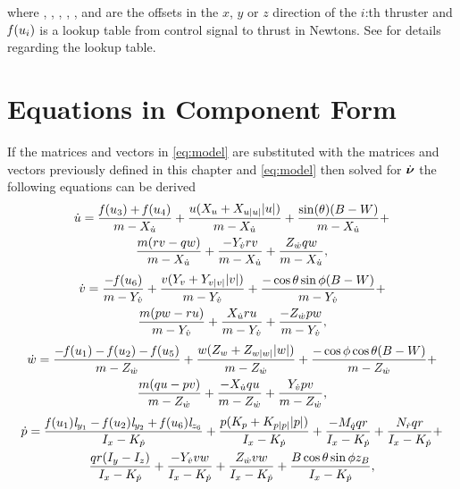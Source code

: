 where , , , , ,  and  are the offsets in the $x$, $y$ or $z$ direction of the $i$:th thruster and $\mathit{f}(u_{i})$ is a lookup table from control signal to thrust in Newtons. See  for details regarding the lookup table.

\section{Equations in Component Form}
If the matrices and vectors in \eqref{eq:model} are substituted with the matrices and vectors previously defined in this chapter and \eqref{eq:model} then solved for $\dot{\boldsymbol{\nu}}$ the following equations can be derived 
\begin{multline} \label{eq:u_dot}
\dot{u} = \frac{\mathit{f}(u_{3}) + \mathit{f}(u_{4})}{m -X_{\dot{u}}} + \frac{u (X_{u} + X_{u|u|} |u|)}{m -X_{\dot{u}}} + \frac{\sin(\theta)(B - W)}{m -X_{\dot{u}}} +\\
\frac{m(r v - q w )}{m -X_{\dot{u}}} + \frac{-Y_{\dot{v}} r v}{m -X_{\dot{u}}} + \frac{Z_{\dot{w}} q w}{m -X_{\dot{u}}},
\end{multline}
\begin{multline} \label{eq:v_dot}
\dot{v} = \frac{-\mathit{f}(u_{6})}{m - Y_{\dot{v}}} + \frac{v (Y_{v} + Y_{v|v|} |v|)}{m - Y_{\dot{v}}} + \frac{-\cos{\theta} \sin{\phi}(B - W)}{m - Y_{\dot{v}}} +\\ \frac{m(p w - r u)}{m - Y_{\dot{v}}} + \frac{X_{\dot{u}} r u}{m - Y_{\dot{v}}} + \frac{-Z_{\dot{w}} p w}{m - Y_{\dot{v}}},
\end{multline}
\begin{multline} \label{eq:w_dot}
\dot{w} = \frac{-\mathit{f}(u_{1}) - \mathit{f}(u_{2}) - \mathit{f}(u_{5})}{m - Z_{\dot{w}}} + \frac{w (Z_{w} + Z_{w|w|} |w|)}{m - Z_{\dot{w}}} + \frac{-\cos{\phi}\cos{\theta}(B - W)}{m - Z_{\dot{w}}} +\\
\frac{m (q u - p v)}{m - Z_{\dot{w}}} + \frac{-X_{\dot{u}} q u}{m - Z_{\dot{w}}} + \frac{Y_{\dot{v}} p v}{m - Z_{\dot{w}}},
\end{multline}
\begin{multline} \label{eq:p_dot}
\dot{p} = \frac{\mathit{f}(u_{1}) \mathit{l}_{y_{1}} - \mathit{f}(u_{2}) \mathit{l}_{y_{2}} + \mathit{f}(u_{6}) \mathit{l}_{z_{6}}}{I_{x} - K_{\dot{p}}} + \frac{p (K_{p} + K_{p|p|} |p|)}{I_{x} - K_{\dot{p}}} + \frac{-M_{\dot{q}} q r}{I_{x} - K_{\dot{p}}} + \frac{N_{\dot{r}} q r}{I_{x} - K_{\dot{p}}} +\\
\frac{q r (I_{y} - I_{z})}{I_{x} - K_{\dot{p}}} + \frac{- Y_{\dot{v}} v w}{I_{x} - K_{\dot{p}}} + \frac{Z_{\dot{w}} v w}{I_{x} - K_{\dot{p}}} + \frac{B \cos{\theta} \sin{\phi} z_B}{I_{x} - K_{\dot{p}}},
\end{multline}
